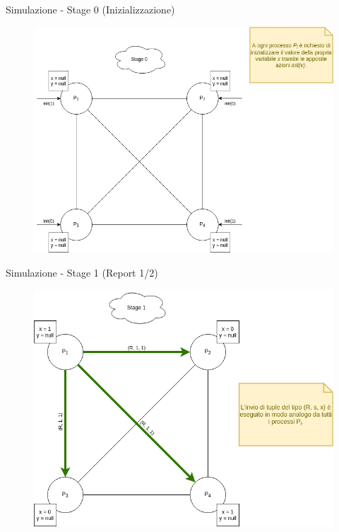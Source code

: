 \documentclass{beamer}
\begin{document}
\begin{frame}{Simulazione - Stage 0 (Inizializzazione)}
\begin{figure}
    \centering
    \includegraphics[scale=0.35]{simulazione/simulazione2.png}
\end{figure}
\end{frame}

\begin{frame}{Simulazione - Stage 1 (Report 1/2)}
\begin{figure}
    \centering
    \includegraphics[scale=0.35]{simulazione/simulazione3.png}
\end{figure}
\end{frame}
\end{document}
